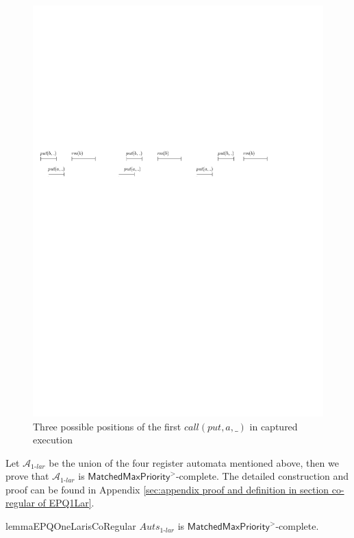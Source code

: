 \begin{figure}[htbp]
  \centering
  \includegraphics[width=1 \textwidth]{figures/PIC_HIS_PQ1Lar-pprr-in-paper.pdf}
  \caption{Three possible positions of the first $\textit{call}(\textit{put},a,\_)$ in captured execution}
  \label{fig:executions APQ1Lar-1 in paper}
\end{figure}


{\color {blue}
Let $\mathcal{A}_{\textit{1-lar}}$ be the union of the four register automata mentioned above, then we prove that $\mathcal{A}_{\textit{1-lar}}$ is $\mathsf{MatchedMaxPriority}^{>}$-complete. The detailed construction and proof can be found in Appendix \ref{sec:appendix proof and definition in section co-regular of EPQ1Lar}.
}

\begin{restatable}{lemma}{EPQOneLarisCoRegular}
\label{lemma:EPQ1Lar is co-regular}
$\textit{Auts}_{\textit{1-lar}}$ is $\mathsf{MatchedMaxPriority}^{>}$-complete.
\end{restatable}


